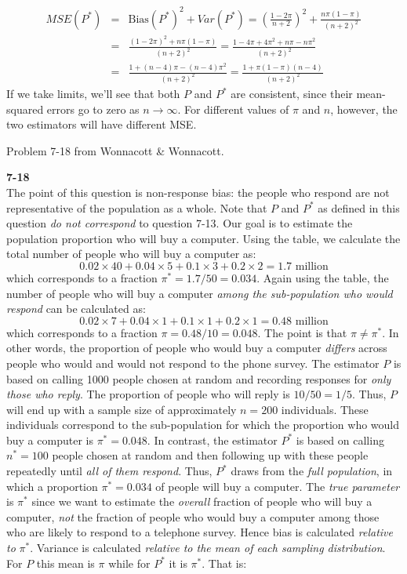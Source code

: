 \documentclass[addpoints,12pt]{exam}\usepackage[]{graphicx}\usepackage[]{color}
\begin{document}
\begin{questions}
\begin{solution}
\begin{eqnarray*}
		MSE(P^*) &=& \mbox{Bias}(P^*)^2 + Var(P^*) = \left(\frac{1-2\pi}{n+2}\right)^2 + \frac{n\pi(1-\pi)}{(n+2)^2}\\
			&=& \frac{(1-2\pi)^2 + n\pi(1-\pi)}{(n+2)^2} = \frac{1 - 4\pi + 4\pi^2 + n\pi - n\pi^2}{(n+2)^2}\\
			&=& \frac{1 + (n-4)\pi - (n-4)\pi^2 }{(n+2)^2} =\frac{1 + \pi(1-\pi)(n-4)}{(n+2)^2}
	\end{eqnarray*}
	If we take limits, we'll see that both $P$ and $P^*$ are consistent, since their mean-squared errors go to zero as $n\rightarrow  \infty$. For different values of $\pi$ and $n$, however, the two estimators will have different MSE. %
    \end{solution}

  \question Problem 7-18 from Wonnacott \& Wonnacott. 
    \begin{solution}
    \textbf{7-18}\\
    The point of this question is non-response bias: the people who respond are not representative of the population as a whole. Note that $P$ and $P^*$ as defined in this question \emph{do not correspond} to question 7-13. Our goal is to estimate the population proportion who will buy a computer. Using the table, we calculate the total number of people who will buy a computer as:
  $$0.02 \times 40 + 0.04\times 5 + 0.1\times 3 + 0.2\times 2 = 1.7 \mbox{ million}$$
which corresponds to a fraction $\pi^* = 1.7/50 = 0.034$. Again using the table, the number of people who will buy a computer \emph{among the sub-population who would respond} can be calculated as:
	$$0.02 \times 7 + 0.04\times 1 + 0.1\times 1 + 0.2\times 1 =  0.48 \mbox{ million}$$
which corresponds to a fraction $\pi = 0.48/10 = 0.048$. The point is that $\pi \neq \pi^*$. In other words, the proportion of people who would buy a computer \emph{differs} across people who would and would not respond to the phone survey. The estimator $P$ is based on calling 1000 people chosen at random and recording responses for \emph{only those who reply}. The proportion of people who will reply is $10/50 = 1/5$. Thus, $P$ will end up with a sample size of approximately $n=200$ individuals. These individuals correspond to the sub-population for which the proportion who would buy a computer is $\pi^* = 0.048$. In contrast, the estimator $P^*$ is based on calling $n^* = 100$ people chosen at random and then following up with these people repeatedly until \emph{all of them respond}. Thus, $P^*$ draws from the \emph{full population}, in which a proportion $\pi^* = 0.034$ of people will buy a computer. The \emph{true parameter} is $\pi^*$ since we want to estimate the \emph{overall} fraction of people who will buy a computer, \emph{not} the fraction of people who would buy a computer among those who are likely to respond to a telephone survey. Hence bias is calculated \emph{relative to} $\pi^*$. Variance is calculated \emph{relative to the mean of each sampling distribution}. For $P$ this mean is $\pi$ while for $P^*$ it is $\pi^*$. That is:

\end{solution}
\end{questions}
\end{document}
